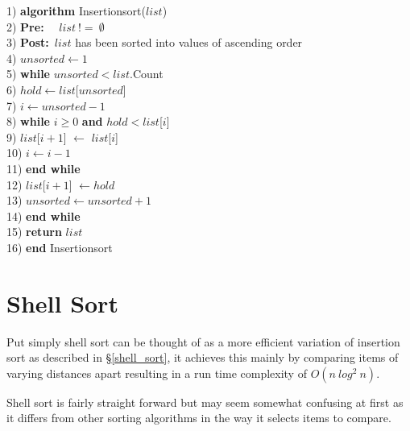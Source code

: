 \begin{tabbing}
1)  \textbf{alg}\= \textbf{orithm} Insertionsort($list$) \\
2)  \> \textbf{Pre:}~~ $list~!=~\emptyset$ \\
3)  \> \textbf{Post:}~$list$ has been sorted into values of ascending order \\
4)  \> $unsorted \leftarrow 1$ \\
5)  \> \textbf{whi}\= \textbf{le} $unsorted < list$.Count \\
6)  \> \> $hold \leftarrow list$[$unsorted$] \\
7)  \> \> $i \leftarrow unsorted - 1$ \\
8)  \> \> \textbf{whi}\= \textbf{le} $i \geq 0$ \textbf{and} $hold < list$[$i$] \\
9)  \> \> \> $list$[$i + 1$] $\leftarrow$ $list$[$i$] \\
10) \> \> \> $i \leftarrow i - 1$ \\
11) \> \> \textbf{end while} \\
12) \> \> $list$[$i+1$] $\leftarrow hold$ \\
13) \> \> $unsorted \leftarrow unsorted + 1$ \\
14) \> \textbf{end while} \\
15) \> \textbf{return} $list$ \\
16) \textbf{end} Insertionsort \\
\end{tabbing}

\newpage
\section{Shell Sort}
Put simply shell sort can be thought of as a more efficient variation of insertion sort as described in \S\ref{shell_sort}, it achieves this mainly by comparing items of varying distances apart resulting in a run time complexity of $O(n~log^{2}~n)$.

Shell sort is fairly straight forward but may seem somewhat confusing at first as it differs from other sorting algorithms in the way it selects items to compare. 

